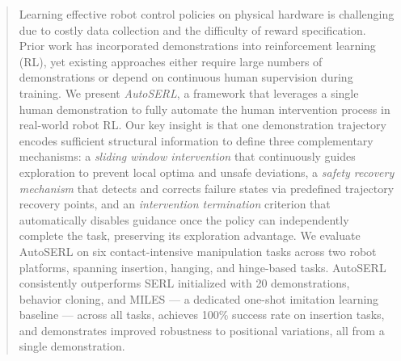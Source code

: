 \documentclass[runningheads]{llncs}
\begin{document}
\begin{abstract}
  Learning effective robot control policies on physical hardware is challenging due to costly data collection and the difficulty of reward specification. Prior work has incorporated demonstrations into reinforcement learning (RL), yet existing approaches either require large numbers of demonstrations or depend on continuous human supervision during training. We present \textit{AutoSERL}, a framework that leverages a single human demonstration to fully automate the human intervention process in real-world robot RL. Our key insight is that one demonstration trajectory encodes sufficient structural information to define three complementary mechanisms: a \textit{sliding window intervention} that continuously guides exploration to prevent local optima and unsafe deviations, a \textit{safety recovery mechanism} that detects and corrects failure states via predefined trajectory recovery points, and an \textit{intervention termination} criterion that automatically disables guidance once the policy can independently complete the task, preserving its exploration advantage. We evaluate AutoSERL on six contact-intensive manipulation tasks across two robot platforms, spanning insertion, hanging, and hinge-based tasks. AutoSERL consistently outperforms SERL initialized with 20 demonstrations, behavior cloning, and MILES — a dedicated one-shot imitation learning baseline — across all tasks, achieves 100\% success rate on insertion tasks, and demonstrates improved robustness to positional variations, all from a single demonstration.
\end{abstract}
\end{document}
